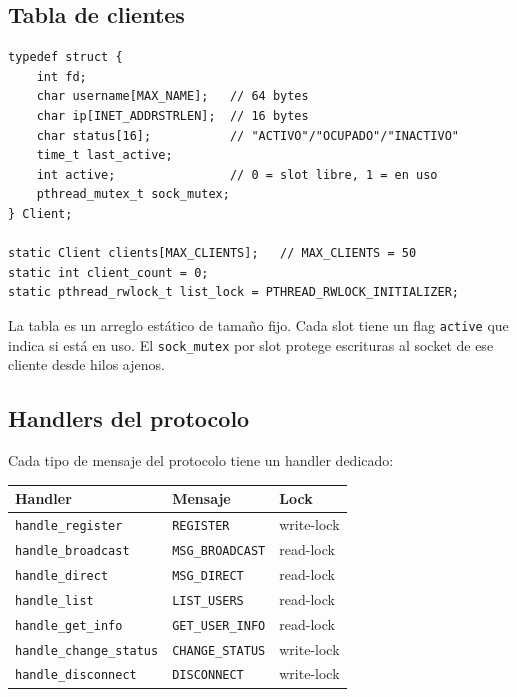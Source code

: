 \documentclass[12pt,a4paper]{article}
\begin{document}
\subsection{Tabla de clientes}

\begin{lstlisting}[caption={Estructura Client y tabla compartida (\texttt{server/session.c})}]
typedef struct {
    int fd;
    char username[MAX_NAME];   // 64 bytes
    char ip[INET_ADDRSTRLEN];  // 16 bytes
    char status[16];           // "ACTIVO"/"OCUPADO"/"INACTIVO"
    time_t last_active;
    int active;                // 0 = slot libre, 1 = en uso
    pthread_mutex_t sock_mutex;
} Client;

static Client clients[MAX_CLIENTS];   // MAX_CLIENTS = 50
static int client_count = 0;
static pthread_rwlock_t list_lock = PTHREAD_RWLOCK_INITIALIZER;
\end{lstlisting}

La tabla es un arreglo estático de tamaño fijo.  Cada slot tiene un flag
\texttt{active} que indica si está en uso.  El \texttt{sock\_mutex} por slot
protege escrituras al socket de ese cliente desde hilos ajenos.

\subsection{Handlers del protocolo}

Cada tipo de mensaje del protocolo tiene un handler dedicado:

\begin{center}
\begin{tabular}{lll}
\toprule
\textbf{Handler} & \textbf{Mensaje} & \textbf{Lock} \\
\midrule
\texttt{handle\_register}       & \texttt{REGISTER}        & write-lock \\
\texttt{handle\_broadcast}      & \texttt{MSG\_BROADCAST}  & read-lock \\
\texttt{handle\_direct}         & \texttt{MSG\_DIRECT}     & read-lock \\
\texttt{handle\_list}           & \texttt{LIST\_USERS}     & read-lock \\
\texttt{handle\_get\_info}      & \texttt{GET\_USER\_INFO} & read-lock \\
\texttt{handle\_change\_status} & \texttt{CHANGE\_STATUS}  & write-lock \\
\texttt{handle\_disconnect}     & \texttt{DISCONNECT}      & write-lock \\
\bottomrule
\end{tabular}
\end{center}
\end{document}
